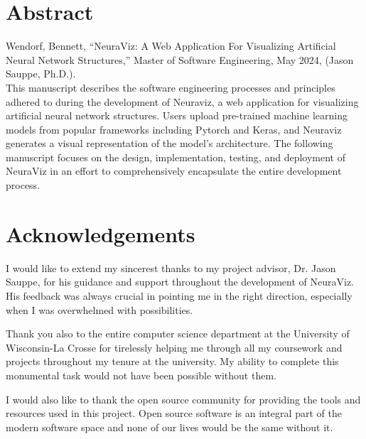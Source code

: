 \documentclass[letterpaper,12pt]{report}
\begin{document}
\hypersetup{pageanchor=false}
	
\clearpage


\clearpage

\hypersetup{pageanchor=true}
\setcounter{page}{1}
\renewcommand\arraystretch{1.5}

\section*{Abstract}
Wendorf, Bennett, ``NeuraViz: A Web Application For Visualizing Artificial Neural Network Structures,'' Master of Software Engineering, May 2024, (Jason Sauppe, Ph.D.). \\

This manuscript describes the software engineering processes and principles adhered to during the development of Neuraviz, a web application for visualizing artificial neural network structures. Users upload pre-trained machine learning models from popular frameworks including Pytorch and Keras, and Neuraviz generates a visual representation of the model's architecture. The following manuscript focuses on the design, implementation, testing, and deployment of NeuraViz in an effort to comprehensively encapsulate the entire development process.
\clearpage

\section*{Acknowledgements}
I would like to extend my sincerest thanks to my project advisor, Dr. Jason Sauppe, for his guidance and support throughout the development of NeuraViz. His feedback was always crucial in pointing me in the right direction, especially when I was overwhelmed with possibilities. 

Thank you also to the entire computer science department at the University of Wisconsin-La Crosse for tirelessly helping me through all my coursework and projects throughout my tenure at the university. My ability to complete this monumental task would not have been possible without them.

I would also like to thank the open source community for providing the tools and resources used in this project. Open source software is an integral part of the modern software space and none of our lives would be the same without it.
\end{document}
